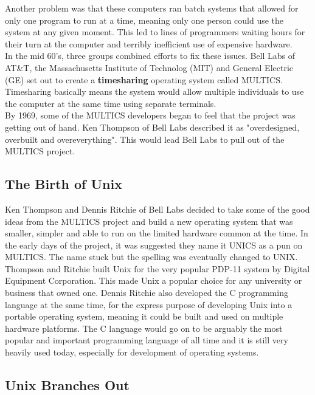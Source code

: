 Another problem was that these computers ran batch systems that allowed for only one program to run at a time, meaning only one person could use the system at any given moment.  This led to lines of programmers waiting hours for their turn at the computer and terribly inefficient use of expensive hardware.\\

In the mid 60's, three groups combined efforts to fix these issues.  Bell Labs of AT\&T, the Massachusetts Institute of Technolog (MIT) and General Electric (GE) set out to create a \textbf{timesharing} operating system called MULTICS.  Timesharing basically means the system would allow multiple individuals to use the computer at the same time using separate terminals.\\

By 1969, some of the MULTICS developers began to feel that the project was getting out of hand.  Ken Thompson of Bell Labs described it as "overdesigned, overbuilt and overeverything".  This would lead Bell Labs to pull out of the MULTICS project.\\

\subsection{The Birth of Unix}

Ken Thompson and Dennis Ritchie of Bell Labs decided to take some of the good ideas from the MULTICS project and build a new operating system that was smaller, simpler and able to run on the limited hardware common at the time.  In the early days of the project, it was suggested they name it UNICS as a pun on MULTICS.  The name stuck but the spelling was eventually changed to UNIX.\\

Thompson and Ritchie built Unix for the very popular PDP-11 system by Digital Equipment Corporation.  This made Unix a popular choice for any university or business that owned one.  Dennis Ritchie also developed the C programming language at the same time, for the express purpose of developing Unix into a portable operating system, meaning it could be built and used on multiple hardware platforms.  The C language would go on to be arguably the most popular and important programming language of all time and it is still very heavily used today, especially for development of operating systems.

\subsection{Unix Branches Out}

